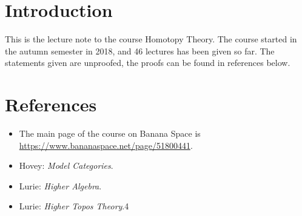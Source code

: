 \section*{Introduction}

This is the lecture note to the course Homotopy Theory. 
The course started in the autumn semester in 2018, and 46 lectures has been given so far.
The statements given are unproofed, the proofs can be found in references below.

\section*{References}

\begin{itemize}
\item The main page of the course on Banana Space is \url{https://www.bananaspace.net/page/51800441}.    
\item Hovey: \textit{Model Categories}.
\item Lurie: \textit{Higher Algebra}.
\item Lurie: \textit{Higher Topos Theory}.4
\end{itemize}